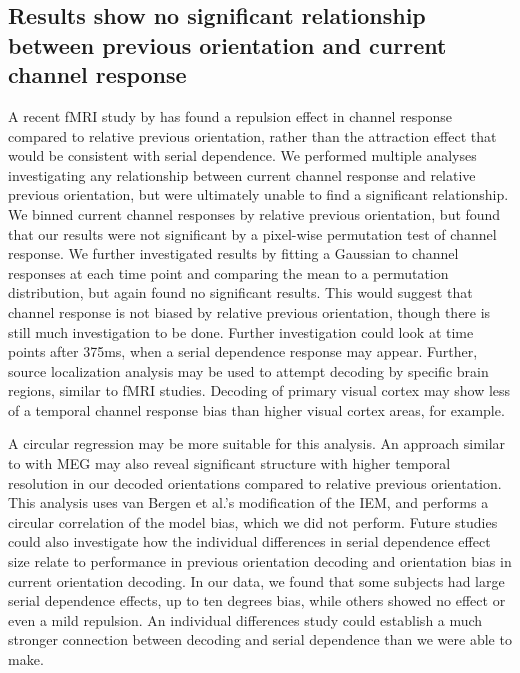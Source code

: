 \documentclass[../main.tex]{subfiles}
\begin{document}
\subsection{Results show no significant relationship between previous orientation and current channel response}
A recent fMRI study by \cite{Sheehan2021.04.06.438664} has found a repulsion effect in channel response compared to relative previous orientation, rather than the attraction effect that would be consistent with serial dependence. We performed multiple analyses investigating any relationship between current channel response and relative previous orientation, but were ultimately unable to find a significant relationship. We binned current channel responses by relative previous orientation, but found that our results were not significant by a pixel-wise permutation test of channel response. We further investigated results by fitting a Gaussian to channel responses at each time point and comparing the mean to a permutation distribution, but again found no significant results. This would suggest that channel response is not biased by relative previous orientation, though there is still much investigation to be done. Further investigation could look at time points after 375ms, when a serial dependence response may appear. Further, source localization analysis may be used to attempt decoding by specific brain regions, similar to fMRI studies. Decoding of primary visual cortex may show less of a temporal channel response bias than higher visual cortex areas, for example.

A circular regression may be more suitable for this analysis. An approach similar to \cite{Sheehan2021.04.06.438664} with MEG may also reveal significant structure with higher temporal resolution in our decoded orientations compared to relative previous orientation. This analysis uses van Bergen et al.'s modification of the IEM, and performs a circular correlation of the model bias, which we did not perform. Future studies could also investigate how the individual differences in serial dependence effect size relate to performance in previous orientation decoding and orientation bias in current orientation decoding. In our data, we found that some subjects had large serial dependence effects, up to ten degrees bias, while others showed no effect or even a mild repulsion. An individual differences study could establish a much stronger connection between decoding and serial dependence than we were able to make.
\end{document}
